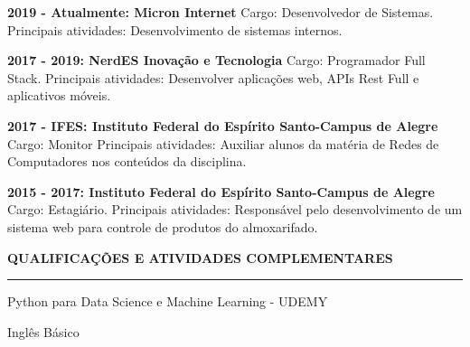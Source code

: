 \documentclass[a4paper,10pt]{article}
\begin{document}
\begin{itemize}
    \begin{item}
        \textbf{2019 - Atualmente: Micron Internet}
        \newline
        Cargo: Desenvolvedor de Sistemas.
        \newline
        Principais atividades: Desenvolvimento de sistemas internos.
    \end{item}

    \begin{item}
        \textbf{2017 - 2019: NerdES Inova\c{c}\~{a}o e Tecnologia}
        \newline
        Cargo: Programador Full Stack.
        \newline
        Principais atividades: Desenvolver aplica\c{c}\~{o}es web, APIs Rest Full e aplicativos móveis.
    \end{item}
    \begin{item}
        \textbf{2017 - IFES: Instituto Federal do Esp\'{i}rito Santo-Campus de Alegre}
        \newline
        Cargo: Monitor
       \newline
        Principais atividades: Auxiliar alunos da matéria de Redes de Computadores nos conteúdos da disciplina.
    \end{item}
    \begin{item}
        \textbf{2015 - 2017: Instituto Federal do Esp\'{i}rito Santo-Campus de Alegre}
        \newline
        Cargo: Estagi\'{a}rio.
       \newline
        Principais atividades: Respons\'{a}vel pelo desenvolvimento de um sistema web para controle de produtos do almoxarifado.
    \end{item}
\end{itemize}

\begin{flushleft}
\textbf{QUALIFICA\c{C}\~{O}ES E ATIVIDADES COMPLEMENTARES}
\noindent\textcolor{gray}{\rule{18cm}{1px}}
\end{flushleft}

\begin{itemize}
    \begin{item}
        Python para Data Science e Machine Learning - UDEMY
    \end{item}
    \begin{item}
        Ingl\^{e}s Básico
    \end{item}
    \newline
\end{itemize}
    
\end{document}
